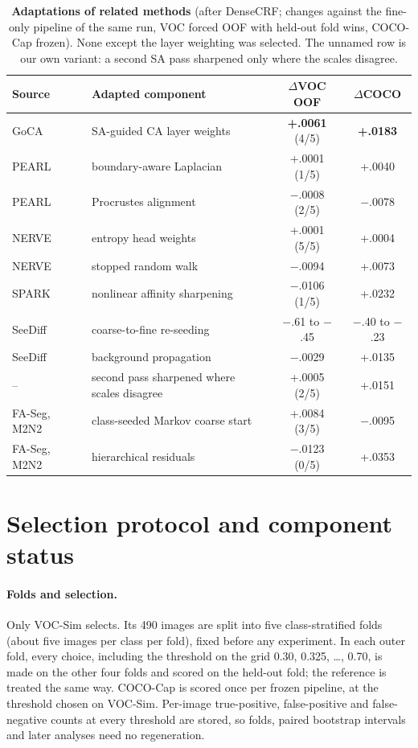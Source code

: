 \documentclass[10pt,twocolumn,letterpaper]{article}
\begin{document}
\begin{table}[t]
\centering
\footnotesize\setlength{\tabcolsep}{6pt}
\begin{tabular}{@{}llcc@{}}
\toprule
Source & Adapted component & $\Delta$VOC OOF & $\Delta$COCO \\
\midrule
GoCA~\cite{meng2026making} & SA-guided CA layer weights & \textbf{+.0061} (4/5) & \textbf{+.0183} \\
PEARL~\cite{pei2026pearl} & boundary-aware Laplacian & +.0001 (1/5) & +.0040 \\
PEARL & Procrustes alignment & $-$.0008 (2/5) & $-$.0078 \\
NERVE~\cite{mahatha2025nerve} & entropy head weights & +.0001 (5/5) & +.0004 \\
NERVE & stopped random walk & $-$.0094 & +.0073 \\
SPARK~\cite{mahatha2026spark} & nonlinear affinity sharpening & $-$.0106 (1/5) & +.0232 \\
SeeDiff~\cite{park2025seediff} & coarse-to-fine re-seeding & $-$.61 to $-$.45 & $-$.40 to $-$.23 \\
SeeDiff & background propagation & $-$.0029 & +.0135 \\
-- & second pass sharpened where scales disagree & +.0005 (2/5) & +.0151 \\
FA-Seg, M2N2~\cite{che2025faseg,karmann2025m2n2} & class-seeded Markov coarse start & +.0084 (3/5) & $-$.0095 \\
FA-Seg, M2N2 & hierarchical residuals & $-$.0123 (0/5) & +.0353 \\
\bottomrule
\end{tabular}
\caption{\textbf{Adaptations of related methods} (after DenseCRF; changes against the fine-only pipeline of the same run, VOC forced OOF with held-out fold wins, COCO-Cap frozen). None except the layer weighting was selected. The unnamed row is our own variant: a second SA pass sharpened only where the scales disagree.}
\label{tab:s_related}
\end{table}

\section{Selection protocol and component status}
\label{sec:s_protocol}

\paragraph{Folds and selection.}
Only VOC-Sim selects. Its 490 images are split into five class-stratified folds (about five images per class per fold), fixed before any experiment. In each outer fold, every choice, including the threshold on the grid 0.30, 0.325, \ldots, 0.70, is made on the other four folds and scored on the held-out fold; the reference is treated the same way. COCO-Cap is scored once per frozen pipeline, at the threshold chosen on VOC-Sim. Per-image true-positive, false-positive and false-negative counts at every threshold are stored, so folds, paired bootstrap intervals and later analyses need no regeneration.
\end{document}

